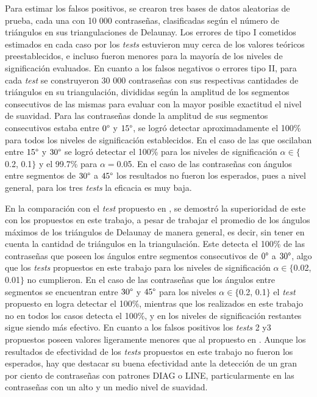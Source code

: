 \documentclass[12pt]{report}
\begin{document}
Para estimar los falsos positivos, se crearon tres bases de datos aleatorias de prueba, cada una con 10 000 contraseñas, clasificadas según el número de triángulos en sus triangulaciones de Delaunay. Los errores de tipo I cometidos estimados en cada caso por los \textit{tests} estuvieron muy cerca de los valores teóricos preestablecidos, e incluso fueron menores para la mayoría de los niveles de significación evaluados. En cuanto a los falsos negativos o errores tipo II, para cada \textit{test} se construyeron 30 000 contraseñas con sus respectivas cantidades de triángulos en  su triangulación, divididas según la amplitud de los segmentos consecutivos de las mismas para evaluar con la mayor posible exactitud el nivel de suavidad. Para las contraseñas donde  la amplitud de sus segmentos consecutivos estaba entre $0\degree$ y $15\degree$, se logró detectar aproximadamente el 100\% para todos los niveles de significación establecidos. En el caso de las que oscilaban entre $15\degree$ y $30\degree$  se logró detectar el 100\% para los niveles de significación $\alpha \in \{$0.2, 0.1$\}$ y el 99.7\% para $\alpha=$0.05. En el caso de las contraseñas con ángulos entre segmentos de $30\degree$ a $45\degree$  los resultados no fueron los esperados, pues a nivel general, para los tres \textit{tests}  la eficacia es muy baja.

En la comparación con el \textit{test} propuesto en \cite{13}, se demostró la superioridad de este con los propuestos en este trabajo, a pesar de trabajar el promedio de los ángulos máximos de los triángulos de Delaunay de manera general, es decir, sin tener en cuenta la cantidad de triángulos en  la triangulación. Este detecta el 100\% de las contraseñas que poseen los ángulos entre segmentos consecutivos de $0\degree$ a $30\degree$, algo que los \textit{tests} propuestos en este trabajo para los niveles de significación $\alpha \in \{$0.02, 0.01$\}$ no cumplieron. En el caso de las contraseñas que los ángulos entre segmentos se encuentran entre $30\degree$ y $45\degree$ para los niveles $\alpha \in \{$0.2, 0.1$\}$ el \textit{test} propuesto en \cite{13} logra detectar el 100\%, mientras que los realizados en este trabajo no en todos los casos detecta el 100\%, y en los niveles de significación restantes sigue siendo más efectivo. En cuanto a los falsos positivos los \textit{tests} 2 y3 propuestos poseen valores ligeramente menores que al propuesto en \cite{13}. Aunque los resultados de efectividad de los \textit{tests} propuestos en este trabajo no fueron los esperados, hay que destacar su buena efectividad ante la detección de un gran por ciento de contraseñas con patrones DIAG o LINE, particularmente en las contraseñas con un alto y un medio nivel de suavidad.
\end{document}
